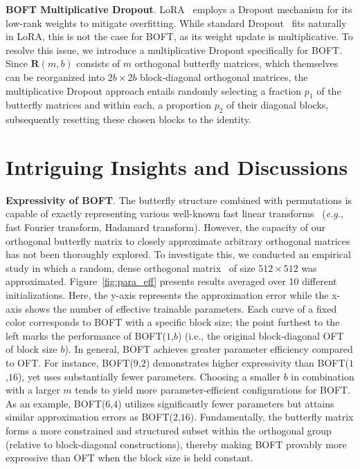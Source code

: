 \textbf{BOFT Multiplicative Dropout}. LoRA~\cite{hulora2022} employs a Dropout mechanism for its low-rank weights to mitigate overfitting. While standard Dropout~\cite{srivastava2014dropout} fits naturally in LoRA, this is not the case for BOFT, as its weight update is multiplicative. To resolve this issue, we introduce a multiplicative Dropout specifically for BOFT. Since $\bm{R}(m,b)$ consists of $m$ orthogonal butterfly matrices, which themselves can be reorganized into $2b \times 2b$ block-diagonal orthogonal matrices, the multiplicative Dropout approach entails randomly selecting a fraction $p_1$ of the butterfly matrices and within each, a proportion $p_2$ of their diagonal blocks, subsequently resetting these chosen blocks to the identity.

\section{Intriguing Insights and Discussions}

\textbf{Expressivity of BOFT}. The butterfly structure combined with permutations is capable of exactly representing various well-known fast linear transforms~\cite{dao2019learning,dao2019kaleidoscope} (\emph{e.g.}, fast Fourier transform, Hadamard transform). However, the capacity of our orthogonal butterfly matrix to closely approximate arbitrary orthogonal matrices has not been thoroughly explored. To investigate this, we conducted an empirical study in which a random, dense orthogonal matrix~\cite{anderson1987generation} of size $512\times 512$ was approximated. Figure~\ref{fig:para_eff} presents results averaged over 10 different initializations. Here, the y-axis represents the approximation error while the x-axis shows the number of effective trainable parameters. Each curve of a fixed color corresponds to BOFT with a specific block size; the point furthest to the left marks the performance of BOFT($1$,$b$) (i.e., the original block-diagonal OFT of block size $b$). In general, BOFT achieves greater parameter efficiency compared to OFT. For instance, BOFT($9$,$2$) demonstrates higher expressivity than BOFT($1$,$16$), yet uses substantially fewer parameters. Choosing a smaller $b$ in combination with a larger $m$ tends to yield more parameter-efficient configurations for BOFT. As an example, BOFT($6$,$4$) utilizes significantly fewer parameters but attains similar approximation errors as BOFT($2$,$16$). Fundamentally, the butterfly matrix forms a more constrained and structured subset within the orthogonal group (relative to block-diagonal constructions), thereby making BOFT provably more expressive than OFT when the block size is held constant.

